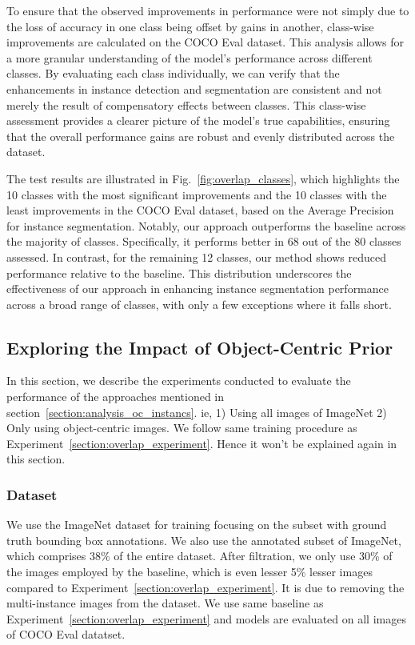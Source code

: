 To ensure that the observed improvements in performance were not simply due to the loss of accuracy in one class being offset by gains in another, class-wise improvements are calculated on the COCO Eval dataset. This analysis allows for a more granular understanding of the model’s performance across different classes. By evaluating each class individually, we can verify that the enhancements in instance detection and segmentation are consistent and not merely the result of compensatory effects between classes. This class-wise assessment provides a clearer picture of the model's true capabilities, ensuring that the overall performance gains are robust and evenly distributed across the dataset.

The test results are illustrated in Fig.~\ref{fig:overlap_classes}, which highlights the 10 classes with the most significant improvements and the 10 classes with the least improvements in the COCO Eval dataset, based on the Average Precision for instance segmentation. Notably, our approach outperforms the baseline across the majority of classes. Specifically, it performs better in 68 out of the 80 classes assessed. In contrast, for the remaining 12 classes, our method shows reduced performance relative to the baseline. This distribution underscores the effectiveness of our approach in enhancing instance segmentation performance across a broad range of classes, with only a few exceptions where it falls short.

\subsection{Exploring the Impact of Object-Centric Prior}
In this section, we describe the experiments conducted to evaluate the performance of the approaches mentioned in section~\ref{section:analysis_oc_instancs}. ie, 1) Using all images of ImageNet 2) Only using object-centric images. We follow same training procedure as Experiment~\ref{section:overlap_experiment}. Hence it won't be explained again in this section.

\subsubsection{Dataset}
We use the ImageNet dataset for training focusing on the subset with ground truth bounding box annotations. We  also use the annotated subset of ImageNet, which comprises 38\% of the entire dataset. After filtration, we only use 30\% of the images employed by the baseline, which is even lesser 5\% lesser images compared to Experiment~\ref{section:overlap_experiment}. It is due to removing the multi-instance images from the dataset. We use same baseline as Experiment~\ref{section:overlap_experiment} and models are evaluated on all images of COCO Eval datatset.

